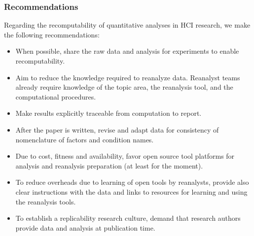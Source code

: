 \subsubsection{Recommendations}
Regarding the recomputability of quantitative analyses in HCI research, we make the following recommendations:
\begin{itemize}
\item When possible, share the raw data and analysis for experiments to enable recomputability.
\item Aim to reduce the knowledge required to reanalyze data. Reanalyst teams already require knowledge of the topic area, the reanalysis tool, and the computational procedures.
\item Make results explicitly traceable from computation to report.
\item After the paper is written, revise and adapt data for consistency of nomenclature of factors and condition names.
\item Due to cost, fitness and availability, favor open source tool platforms for analysis and reanalysis preparation (at least for the moment).
\item To reduce overheads due to learning of open tools by reanalysts, provide also clear instructions with the data and links to resources for learning and using the reanalysis tools.
\item To establish a replicability research culture, demand that research authors provide data and analysis at publication time.
\end{itemize}
